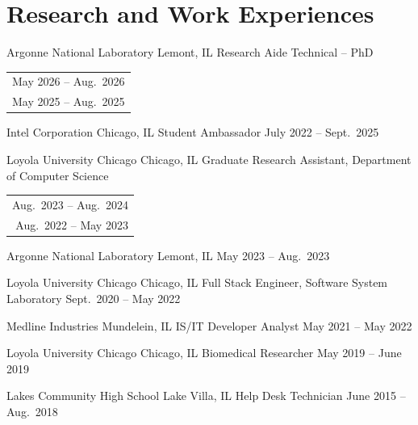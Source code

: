 \section*{Research and Work Experiences}

\cventry
    {Argonne National Laboratory}
    {Lemont, IL}
    {Research Aide Technical -- PhD}
    {%
        \begin{tabular}[t]{@{}r@{}}
            May 2026 -- Aug.\ 2026\\
            May 2025 -- Aug.\ 2025
        \end{tabular}%
    }

\cventry
    {Intel Corporation}
    {Chicago, IL}
    {Student Ambassador}
    {July 2022 -- Sept.\ 2025}

\cventry
    {Loyola University Chicago}
    {Chicago, IL}
    {Graduate Research Assistant, Department of Computer Science}
    {%
        \begin{tabular}[t]{@{}r@{}}
            Aug.\ 2023 -- Aug.\ 2024\\
            Aug.\ 2022 -- May 2023
        \end{tabular}%
    }

\cventry
    {Argonne National Laboratory}
    {Lemont, IL}
    {}
    {May 2023 -- Aug.\ 2023}

\cventry
    {Loyola University Chicago}
    {Chicago, IL}
    {Full Stack Engineer, Software System Laboratory}
    {Sept.\ 2020 -- May 2022}

\cventry
    {Medline Industries}
    {Mundelein, IL}
    {IS/IT Developer Analyst}
    {May 2021 -- May 2022}

\cventry
    {Loyola University Chicago}
    {Chicago, IL}
    {Biomedical Researcher}
    {May 2019 -- June 2019}

\cventry
    {Lakes Community High School}
    {Lake Villa, IL}
    {Help Desk Technician}
    {June 2015 -- Aug.\ 2018}